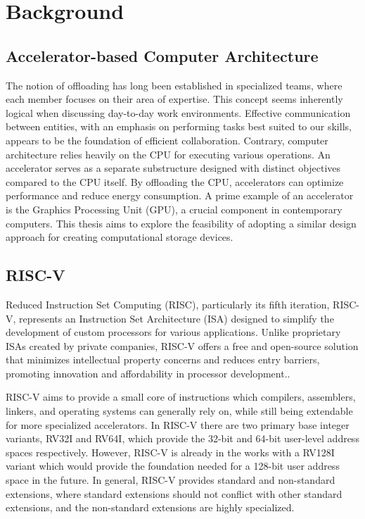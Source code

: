 \section{Background}
\subsection{Accelerator-based Computer Architecture}\label{sec:ACA}
The notion of offloading has long been established in specialized teams, where
each member focuses on their area of expertise. This concept seems inherently
logical when discussing day-to-day work environments. Effective communication
between entities, with an emphasis on performing tasks best suited to our
skills, appears to be the foundation of efficient collaboration. Contrary,
computer architecture relies heavily on the CPU for executing various
operations. An accelerator serves as a separate substructure designed with
distinct objectives compared to the CPU itself. By offloading the CPU,
accelerators can optimize performance and reduce energy consumption\cite{AA}. A
prime example of an accelerator is the Graphics Processing Unit (GPU), a crucial
component in contemporary computers. This thesis aims to explore the feasibility
of adopting a similar design approach for creating computational storage
devices.



\subsection{RISC-V}
Reduced Instruction Set Computing (RISC), particularly its fifth iteration,
RISC-V, represents an Instruction Set Architecture (ISA) designed to simplify
the development of custom processors for various applications. Unlike
proprietary ISAs created by private companies, RISC-V offers a free and
open-source solution that minimizes intellectual property concerns and reduces
entry barriers, promoting innovation and affordability in processor
development.\cite{ISAfree}.

RISC-V aims to provide a small core of instructions which compilers, assemblers,
linkers, and operating systems can generally rely on, while still being
extendable for more specialized accelerators. In RISC-V there are two primary
base integer variants, RV32I and RV64I, which provide the 32-bit and 64-bit
user-level address spaces respectively. However, RISC-V is already in the works
with a RV128I variant which would provide the foundation needed for a 128-bit
user address space in the future. In general, RISC-V provides standard and
non-standard extensions, where standard extensions should not conflict with
other standard extensions, and the non-standard extensions are highly
specialized.

